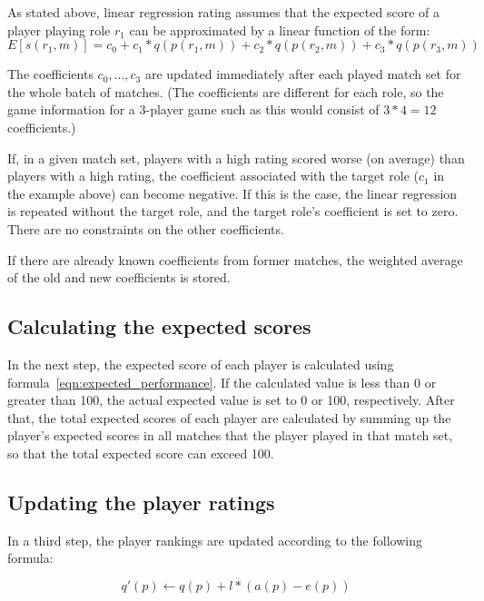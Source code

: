 \documentclass[a4paper,10pt]{article}
\begin{document}
As stated above, linear regression rating assumes that the expected score of a player playing role $r_1$ can be approximated by a linear function of the form:
\begin{equation}
	E[s(r_1, m)] = c_0 + c_1*q(p(r_1, m)) + c_2*q(p(r_2, m)) + c_3*q(p(r_3, m)) 
	\label{eqn:expected_performance}
\end{equation} 

The coefficients $c_0, \dotsc, c_3$ are updated immediately after each played match set for the whole batch of matches. (The coefficients are different for each role, so the game information for a 3-player game such as this would consist of $3 * 4 = 12$ coefficients.)

If, in a given match set, players with a high rating scored worse (on average) than players with a high rating, the coefficient associated with the target role ($c_1$ in the example above) can become negative. If this is the case, the linear regression is repeated without the target role, and the target role's coefficient is set to zero. There are no constraints on the other coefficients.

If there are already known coefficients from former matches, the weighted average of the old and new coefficients is stored.

\subsection{Calculating the expected scores}
\label{sec:calculating_expected_scores}
In the next step, the expected score of each player is calculated using formula~\ref{eqn:expected_performance}. If the calculated value is less than 0 or greater than 100, the actual expected value is set to 0 or 100, respectively. After that, the total expected scores of each player are calculated by summing up the player's expected scores in all matches that the player played in that match set, so that the total expected score can exceed 100.


\subsection{Updating the player ratings}
\label{sec:updating_player_ratings}

In a third step, the player rankings are updated according to the following formula:

\begin{equation}
 q'(p) \leftarrow q(p) + l * (a(p) - e(p))
\end{equation} 
\end{document}
